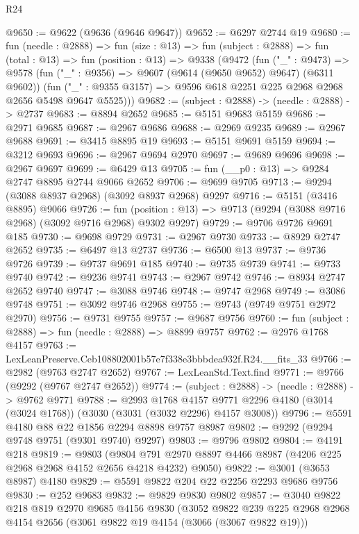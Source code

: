 \begin{lexlean}{R24}
\begin{coremodule}
@9650 := @9622 (@9636 (@9646 @9647))
@9652 := @6297 @2744 @19
@9680 := fun (needle : @2888) =>
  fun (size : @13) =>
  fun (subject : @2888) =>
  fun (total : @13) =>
  fun (position : @13) =>
  @9338
    (@9472
      (fun ("_" : @9473) =>
      @9578
        (fun ("_" : @9356) => @9607 (@9614 (@9650 @9652) @9647) (@6311 @9602))
        (fun ("_" : @9355 @3157) => @9596 @618 @2251 @225 @2968 @2968 @2656 @5498 @9647 @5525)))
@9682 := (subject : @2888) -> (needle : @2888) -> @2737
@9683 := @8894 @2652
@9685 := @5151 @9683 @5159
@9686 := @2971 @9685
@9687 := @2967 @9686
@9688 := @2969 @9235
@9689 := @2967 @9688
@9691 := @3415 @8895 @19
@9693 := @5151 @9691 @5159
@9694 := @3212 @9693
@9696 := @2967 @9694 @2970
@9697 := @9689 @9696
@9698 := @2967 @9697
@9699 := @6429 @13
@9705 := fun (__p0 : @13) => @9284 @2747 @8895 @2744 @9066 @2652
@9706 := @9699 @9705
@9713 := @9294 (@3088 @8937 @2968) (@3092 @8937 @2968) @9297
@9716 := @5151 (@3416 @8895) @9066
@9726 := fun (position : @13) => @9713 (@9294 (@3088 @9716 @2968) (@3092 @9716 @2968) @9302 @9297)
@9729 := @9706 @9726 @9691 @185
@9730 := @9698 @9729
@9731 := @2967 @9730
@9733 := @8929 @2747 @2652
@9735 := @6497 @13 @2737
@9736 := @6500 @13
@9737 := @9736 @9726
@9739 := @9737 @9691 @185
@9740 := @9735 @9739
@9741 := @9733 @9740
@9742 := @9236 @9741
@9743 := @2967 @9742
@9746 := @8934 @2747 @2652 @9740
@9747 := @3088 @9746
@9748 := @9747 @2968
@9749 := @3086 @9748
@9751 := @3092 @9746 @2968
@9755 := @9743 (@9749 @9751 @2972 @2970)
@9756 := @9731 @9755
@9757 := @9687 @9756
@9760 := fun (subject : @2888) => fun (needle : @2888) => @8899 @9757
@9762 := @2976 @1768 @4157
@9763 := LexLeanPreserve.Ceb108802001b57e7f338e3bbbdea932f.R24.__fits_33
@9766 := @2982 (@9763 @2747 @2652)
@9767 := LexLeanStd.Text.find
@9771 := @9766 (@9292 (@9767 @2747 @2652))
@9774 := (subject : @2888) -> (needle : @2888) -> @9762 @9771
@9788 := @2993
    @1768
    @4157
    @9771
    @2296
    @4180
    (@3014 (@3024 @1768))
    (@3030 (@3031 (@3032 @2296) @4157 @3008))
@9796 := @5591 @4180 @88 @22 @1856 @2294 @8898 @9757 @8987
@9802 := @9292 (@9294 @9748 @9751 (@9301 @9740) @9297)
@9803 := @9796 @9802
@9804 := @4191 @218
@9819 := @9803
    (@9804 @791 @2970 @8897 @4466 @8987 (@4206 @225 @2968 @2968 @4152 @2656 @4218 @4232) @9050)
@9822 := @3001 (@3653 @8987) @4180
@9829 := @5591 @9822 @204 @22 @2256 @2293 @9686 @9756
@9830 := @252 @9683
@9832 := @9829 @9830 @9802
@9857 := @3040
    @9822
    @218
    @819
    @2970
    @9685
    @4156
    @9830
    (@3052
      @9822
      @239
      @225
      @2968
      @2968
      @4154
      @2656
      (@3061 @9822 @19 @4154 (@3066 (@3067 @9822 @19)))

\end{coremodule}
\end{lexlean}
